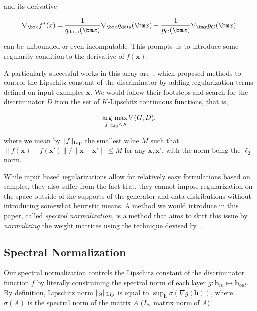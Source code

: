 and its derivative

\begin{align}
\nabla_{\bm x} f^*(x) = \frac{1}{q_{\rm data}({\bm x})}\nabla_{{\bm x}}q_{\rm data}({\bm x}) - \frac{1}{p_G({\bm x})}\nabla_{{\bm x}}p_G({\bm x})
\end{align}

can be unbounded or even incomputable. This prompts us to introduce some regularity condition to the derivative of $f({\bm x})$.

A particularly successful works in this array are~\cite[]{qi2017loss, arjovsky2017wasserstein, gulrajani2017improved}, which proposed methods to control the Lipschitz constant of the  discriminator by adding regularization terms defined on input examples ${\bm x}$. We would follow their footsteps and search for the discriminator $D$ from the set of $K$-Lipschitz continuous functions, that is,

\begin{align}
	\mathop{\rm arg~max}\limits_{\|f\|_{\rm Lip}\leq K} V(G, D), \label{eq:lipschitz}
\end{align}

where we mean by $\|f\|_{\rm Lip}$ the smallest value $M$ such that $\|f({\bm x})-f({\bm x}')\| / \|{\bm x}-{\bm x}'\|\leq M$ for any ${\bm x},{\bm x}'$, with the norm being the $\ell_2$ norm.

While input based regularizations allow for relatively easy formulations based on samples, they also suffer from the fact that, they cannot impose regularization on the space outside of the supports of the generator and data distributions without introducing somewhat heuristic means. A method we would introduce in this paper, called \textit{spectral normalization}, is a method that aims to skirt this issue by \textit{normalizing} the weight matrices using the technique devised by~\cite{yoshida2017spectral}.

\subsection{\label{subsec:SN}Spectral Normalization} Our spectral normalization controls the Lipschitz constant of the discriminator function $f$ by literally constraining the spectral norm of each layer $g: {\bm h}_{in} \mapsto {\bm h}_{out}$. By definition, Lipschitz norm $\|g\|_{\rm Lip}$ is equal to $\sup_{\bm h} \sigma(\nabla g({\bm h}))$, where $\sigma(A)$ is the spectral norm of the matrix $A$ ($L_2$ matrix norm of $A$)

